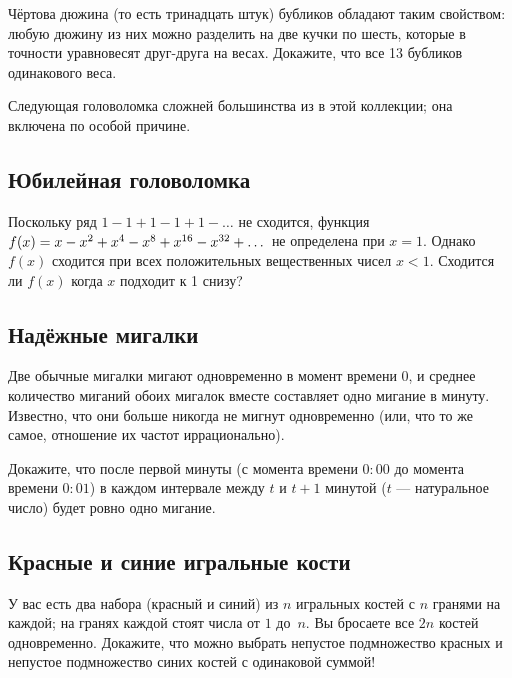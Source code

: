 Чёртова дюжина (то есть тринадцать штук) бубликов обладают таким свойством: любую дюжину из них можно разделить на две кучки по шесть, которые в точности уравновесят друг-друга на весах.
Докажите, что все 13 бубликов одинакового веса.

\medskip

Следующая головоломка сложней большинства из в этой коллекции;
она включена по особой причине.

\subsection*{Юбилейная головоломка}

Поскольку ряд $1 - 1 + 1 - 1 + 1 - \dots$ не сходится,  функция 
$f(x)\z=x-x^2+x^4-x^8+x^{16}-x^{32}+\dots$ не определена при $x=1$.
Однако $f(x)$ сходится при всех положительных вещественных чисел $x<1$.
Сходится ли $f(x)$ когда $x$ подходит к 1 снизу?

\subsection*{Надёжные мигалки}

Две обычные мигалки мигают одновременно в момент времени $0$, и среднее количество миганий обоих мигалок вместе составляет одно мигание в минуту.
Известно, что они больше никогда не мигнут одновременно (или, что то же самое, отношение их частот иррационально).

Докажите, что после первой минуты (с момента времени $0{:}00$ до момента времени $0{:}01$) в каждом интервале между $t$ и $t + 1$ минутой ($t$ --- натуральное число) будет ровно одно мигание.

\subsection*{Красные и синие игральные кости}

У вас есть два набора (красный и синий) из $n$ игральных костей с $n$ гранями на каждой;
на гранях каждой стоят числа от $1$ до~$n$.
Вы бросаете все $2n$ костей одновременно.
Докажите, что можно выбрать непустое подмножество красных и непустое подмножество синих костей с одинаковой суммой!
